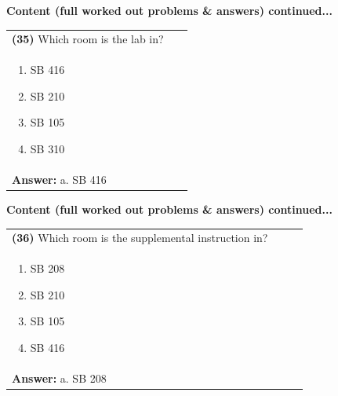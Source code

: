 \documentclass{article}
\begin{document}
{{{{{{{{{{{{{{\newpage
\noindent
{\large\textbf{Content (full worked out problems \& answers) continued...}\\[0.2em]
\vspace{0.2cm}
\begin{tabular}{|p{0.9\linewidth}|}
\hline
\vspace{0.2cm}
\textbf{(35)} Which room is the lab in?\\
\begin{minipage}[t]{0.85\linewidth}
\begin{enumerate}[label=\alph*.]
   \item SB 416
   \item SB 210
   \item SB 105
   \item SB 310
\end{enumerate}
\end{minipage}\\
\hline
\vspace{0.2cm}
\textbf{Answer:} a. SB 416\\
\hline
\end{tabular}

\newpage
\noindent
{\large\textbf{Content (full worked out problems \& answers) continued...}\\[0.2em]
\begin{tabular}{|p{0.9\linewidth}|}
\hline
\vspace{0.2cm}
\textbf{(36)} Which room is the supplemental instruction in?\\
\begin{minipage}[t]{0.85\linewidth}
\begin{enumerate}[label=\alph*.]
   \item SB 208
   \item SB 210
   \item SB 105
   \item SB 416
\end{enumerate}
\end{minipage}\\
\hline
\vspace{0.2cm}
\textbf{Answer:} a. SB 208\\
\hline
\end{tabular}

}}}}}}}}}}}}}}}}
\end{document}
